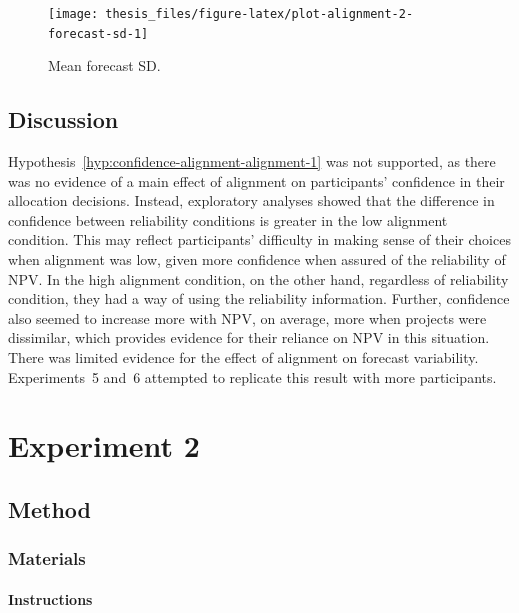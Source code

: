 \documentclass[a4paper, nobind, dvipsnames]{templates/ociamthesis}
\theoremstyle{definition}
\theoremstyle{definition}
\theoremstyle{definition}
\theoremstyle{definition}
\theoremstyle{remark}
\begin{document}
\begin{figure}
\texttt{[image: thesis\_files/figure-latex/plot-alignment-2-forecast-sd-1]} \caption{Mean forecast SD.}\label{fig:plot-alignment-2-forecast-sd}
\end{figure}

\subsection{Discussion}

Hypothesis~\ref{hyp:confidence-alignment-alignment-1} was not supported, as
there was no evidence of a main effect of alignment on participants' confidence
in their allocation decisions. Instead, exploratory analyses showed that the
difference in confidence between reliability conditions is greater in the low
alignment condition. This may reflect participants' difficulty in making sense
of their choices when alignment was low, given more confidence when assured of
the reliability of NPV. In the high alignment condition, on the other hand,
regardless of reliability condition, they had a way of using the reliability
information. Further, confidence also seemed to increase more with NPV, on
average, more when projects were dissimilar, which provides evidence for their
reliance on NPV in this situation. There was limited evidence for the effect of
alignment on forecast variability. Experiments~5 and~6 attempted to replicate
this result with more participants.

\hypertarget{alignment-3-appendix}{%
\section{Experiment 2}\label{alignment-3-appendix}}

\subsection{Method}

\subsubsection{Materials}

\hypertarget{instructions-materials-alignment-3-appendix}{%
\paragraph{Instructions}\label{instructions-materials-alignment-3-appendix}}
\end{document}
